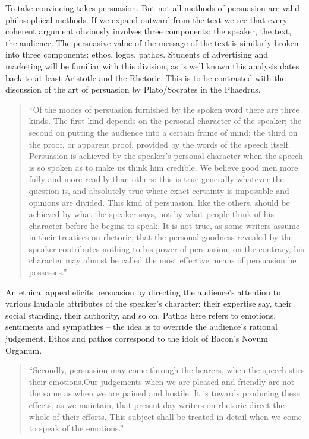 \documentclass[dah,phd,a4paper]{xe_uccthesis}
\begin{document}
To take convincing takes persuasion. But not all methods of persuasion are valid philosophical methods. If we expand outward from the text we see that every coherent argument obviously involves three components: the speaker, the text, the audience. The persuasive value of the message of the text is similarly broken into three components: ethos, logos, pathos. Students of advertising and marketing will be familiar with this division, as is well known this analysis dates back to at least Aristotle and the Rhetoric. This is to be contrasted with the discussion of the art of persuasion by Plato/Socrates in the Phaedrus.

\begin{quotation}
“Of the modes of persuasion furnished by the spoken word there are three kinds. The first kind depends on the personal character of the speaker; the second on putting the audience into a certain frame of mind; the third on the proof, or apparent proof, provided by the words of the speech itself. Persuasion is achieved by the speaker's personal character when the speech is so spoken as to make us think him credible. We believe good men more fully and more readily than others: this is true generally whatever the question is, and absolutely true where exact certainty is impossible and opinions are divided. This kind of persuasion, like the others, should be achieved by what the speaker says, not by what people think of his character before he begins to speak. It is not true, as some writers assume in their treatises on rhetoric, that the personal goodness revealed by the speaker contributes nothing to his power of persuasion; on the contrary, his character may almost be called the most effective means of persuasion he possesses.”
\begin{flushright}
\citep{aristotle_rhetoric_1984}
\end{flushright}
\end{quotation}

An ethical appeal elicits persuasion by directing the audience's attention to various laudable attributes of the speaker's character: their expertise say, their social standing, their authority, and so on. Pathos here refers to emotions, sentiments and sympathies – the idea is to override the audience's rational judgement. Ethos and pathos correspond to the idols of Bacon's Novum Organum.

\begin{quotation}
“Secondly, persuasion may come through the hearers, when the speech stirs their emotions.Our judgements when we are pleased and friendly are not the same as when we are pained and hostile. It is towards producing these effects, as we maintain, that present-day writers on rhetoric direct the whole of their efforts. This subject shall be treated in detail when we come to speak of the emotions.”
\end{quotation}
\end{document}
